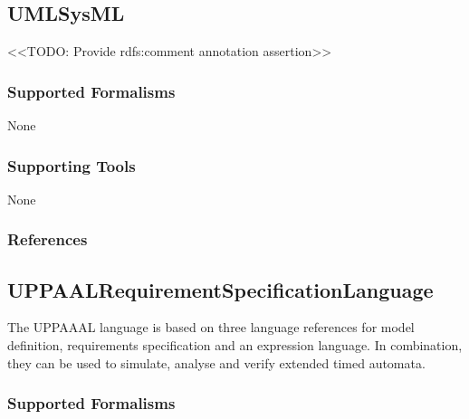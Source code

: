 \subsection{UMLSysML}
\label{subsecL:UMLSysML}


<<TODO: Provide rdfs:comment annotation assertion>>

\subsubsection{Supported Formalisms}

None


\subsubsection{Supporting Tools}

None


\subsubsection{References}





\subsection{UPPAALRequirementSpecificationLanguage}
\label{subsecL:UPPAALRequirementSpecificationLanguage}


The UPPAAAL language is based on three language references for model definition, requirements specification and an expression language.
In combination, they can be used to simulate, analyse and verify extended timed automata.



\subsubsection{Supported Formalisms}

